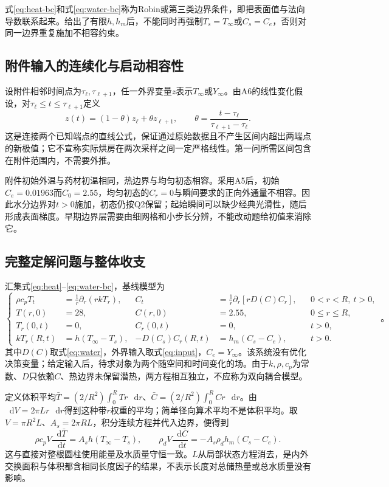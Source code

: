 \documentclass[UTF8,a4paper,zihao=-4,fontset=none]{ctexart}
\numberwithin{equation}{section}
\newcommand{\dd}{\mathop{}\!\mathrm d}
\newcommand{\pd}{\partial}
\begin{document}
式\eqref{eq:heat-bc}和式\eqref{eq:water-bc}称为Robin或第三类边界条件，即把表面值与法向导数联系起来。给出了有限$h,h_m$后，不能同时再强制$T_s=T_\infty$或$C_s=C_e$，否则对同一边界重复施加不相容约束。

\subsection{附件输入的连续化与启动相容性}
设附件相邻时间点为$\tau_\ell,\tau_{\ell+1}$，任一外界变量$z$表示$T_\infty$或$Y_\infty$。由A6的线性变化假设，对$\tau_\ell\le t\le\tau_{\ell+1}$定义
\begin{equation}
z(t)=(1-\theta)z_\ell+\theta z_{\ell+1},
\qquad \theta=\frac{t-\tau_\ell}{\tau_{\ell+1}-\tau_\ell}.
\label{eq:input}
\end{equation}
这是连接两个已知端点的直线公式，保证通过原始数据且不产生区间内超出两端点的新极值；它不宣称实际烘房在两次采样之间一定严格线性。第一问所需区间包含在附件范围内，不需要外推。

附件初始外温与药材初温相同，热边界与均匀初态相容。采用A5后，初始$C_e=0.01963$而$C_0=2.55$，均匀初态的$C_r=0$与瞬间要求的正向外通量不相容。因此水分边界对$t>0$施加，初态仍按Q2保留；起始瞬间可以缺少经典光滑性，随后形成表面梯度。早期边界层需要由细网格和小步长分辨，不能改动题给初值来消除它。

\subsection{完整定解问题与整体收支}
汇集式\eqref{eq:heat}--\eqref{eq:water-bc}，基线模型为
\begin{equation}
\left\{
\begin{aligned}
\rho c_pT_t&=\frac1r\pd_r(rkT_r),&
C_t&=\frac1r\pd_r[rD(C)C_r],&&0<r<R,\ t>0,\\
T(r,0)&=28,& C(r,0)&=2.55,&&0\le r\le R,\\
T_r(0,t)&=0,&C_r(0,t)&=0,&&t>0,\\
kT_r(R,t)&=h(T_\infty-T_s),&
-D(C_s)C_r(R,t)&=h_m(C_s-C_e),&&t>0.
\end{aligned}
\right.\,\text{。}
\label{eq:full}
\end{equation}
其中$D(C)$取式\eqref{eq:water}，外界输入取式\eqref{eq:input}，$C_e=Y_\infty$。该系统没有优化决策变量；给定输入后，待求对象为两个随空间和时间变化的场。由于$k,\rho,c_p$为常数、$D$只依赖$C$、热边界未保留潜热，两方程相互独立，不应称为双向耦合模型。

定义体积平均$\bar T=(2/R^2)\int_0^RT r\,\dd r$、$\bar C=(2/R^2)\int_0^RC r\,\dd r$。由$\dd V=2\pi Lr\,\dd r$得到这种带$r$权重的平均；简单径向算术平均不是体积平均。取$V=\pi R^2L$、$A_s=2\pi RL$，积分连续方程并代入边界，便得到
\begin{equation}
\rho c_pV\frac{\dd\bar T}{\dd t}=A_sh(T_\infty-T_s),
\qquad
\rho_dV\frac{\dd\bar C}{\dd t}=-A_s\rho_dh_m(C_s-C_e).
\label{eq:global}
\end{equation}
这与直接对整根圆柱使用能量及水质量守恒一致。$L$从局部状态方程消去，是内外交换面积与体积都含相同长度因子的结果，不表示长度对总储热量或总水质量没有影响。
\end{document}
